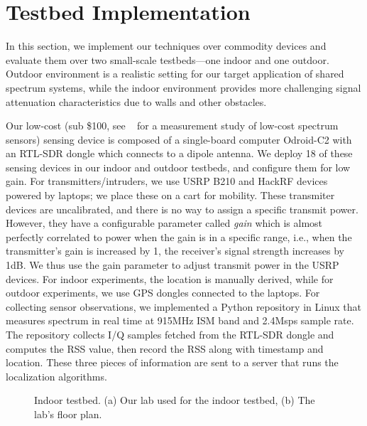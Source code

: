 \section{Testbed Implementation}
\label{testbed}

In this section, we implement our techniques over commodity devices
and evaluate them over two small-scale testbeds---one indoor and one
outdoor.  Outdoor environment is a realistic setting for our target
application of shared spectrum systems, while the indoor environment
provides more challenging signal attenuation characteristics due to
walls and other obstacles.

  Our low-cost (sub \$100, see ~\cite{pam19-lowcostsensing} for a measurement study of low-cost spectrum sensors)
sensing device  is composed of a single-board computer
Odroid-C2 with an RTL-SDR dongle which
connects to a dipole antenna. We deploy 18 of these sensing devices
in our indoor and outdoor testbeds, and configure them for low gain.
For transmitters/intruders, we use USRP B210 and HackRF devices
  powered by laptops; we place these on a cart for mobility. These
  transmiter devices are uncalibrated, and there is no way to assign a
  specific transmit power. However, they have a configurable parameter
  called {\em gain} which is almost perfectly correlated to power when
  the gain is in a specific range, i.e., when the transmitter's gain
  is increased by 1, the receiver's signal strength increases by
  1dB. We thus use the gain parameter to adjust transmit power in the
  USRP devices. For indoor experiments, the location is manually
  derived, while for outdoor experiments, we use GPS
  dongles connected to the laptops. For collecting sensor
  observations, we implemented a Python repository in Linux that
  measures spectrum in real time at 915MHz ISM band and 2.4Msps
  sample rate.  The repository collects I/Q samples fetched from the
  RTL-SDR dongle and computes the RSS value, then record the RSS along
  with timestamp and location.  These three pieces of information are
  sent to a server that runs the localization algorithms. 

\begin{figure}
	\centering
	\qquad
	\hspace{-0.15in}
	\caption{Indoor testbed. (a) Our lab used for the indoor testbed, (b) The lab's floor plan.}
	\label{fig:indoor}
\end{figure}

